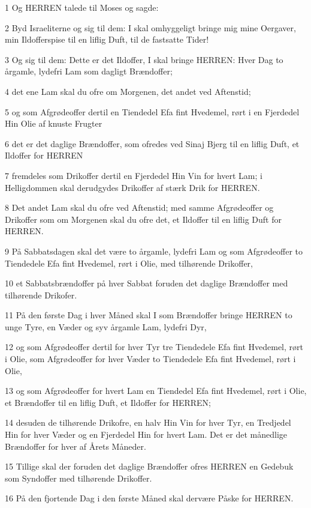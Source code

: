 \par 1 Og HERREN talede til Moses og sagde:
\par 2 Byd Israeliterne og sig til dem: I skal omhyggeligt bringe mig mine Oergaver, min Ildofferspise til en liflig Duft, til de fastsatte Tider!
\par 3 Og sig til dem: Dette er det Ildoffer, I skal bringe HERREN: Hver Dag to årgamle, lydefri Lam som dagligt Brændoffer;
\par 4 det ene Lam skal du ofre om Morgenen, det andet ved Aftenstid;
\par 5 og som Afgrødeoffer dertil en Tiendedel Efa fint Hvedemel, rørt i en Fjerdedel Hin Olie af knuste Frugter
\par 6 det er det daglige Brændoffer, som ofredes ved Sinaj Bjerg til en liflig Duft, et Ildoffer for HERREN
\par 7 fremdeles som Drikoffer dertil en Fjerdedel Hin Vin for hvert Lam; i Helligdommen skal derudgydes Drikoffer af stærk Drik for HERREN.
\par 8 Det andet Lam skal du ofre ved Aftenstid; med samme Afgrødeoffer og Drikoffer som om Morgenen skal du ofre det, et Ildoffer til en liflig Duft for HERREN.
\par 9 På Sabbatsdagen skal det være to årgamle, lydefri Lam og som Afgrødeoffer to Tiendedele Efa fint Hvedemel, rørt i Olie, med tilhørende Drikoffer,
\par 10 et Sabbatsbrændoffer på hver Sabbat foruden det daglige Brændoffer med tilhørende Drikofer.
\par 11 På den første Dag i hver Måned skal I som Brændoffer bringe HERREN to unge Tyre, en Væder og syv årgamle Lam, lydefri Dyr,
\par 12 og som Afgrødeoffer dertil for hver Tyr tre Tiendedele Efa fint Hvedemel, rørt i Olie, som Afgrødeoffer for hver Væder to Tiendedele Efa fint Hvedemel, rørt i Olie,
\par 13 og som Afgrødeoffer for hvert Lam en Tiendedel Efa fint Hvedemel, rørt i Olie, et Brændoffer til en liflig Duft, et Ildoffer for HERREN;
\par 14 desuden de tilhørende Drikofre, en halv Hin Vin for hver Tyr, en Tredjedel Hin for hver Væder og en Fjerdedel Hin for hvert Lam. Det er det månedlige Brændoffer for hver af Årets Måneder.
\par 15 Tillige skal der foruden det daglige Brændoffer ofres HERREN en Gedebuk som Syndoffer med tilhørende Drikoffer.
\par 16 På den fjortende Dag i den første Måned skal dervære Påske for HERREN.
